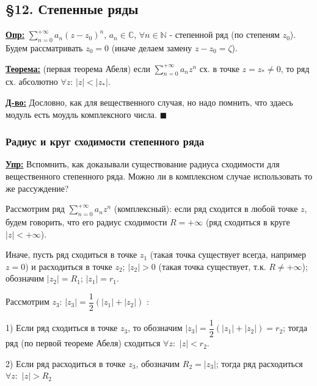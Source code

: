 \documentclass[a4paper, 12pt]{article}
\begin{document}
  \begin{center}
    \subsection*{\S12. Степенные ряды }
  \end{center}

	\quad \underline{\textbf{Опр:}} $\displaystyle \sum\limits_{n=0}^{+\infty} a_n (z-z_0)^n$, $a_n \in \mathbb{C}$, $\forall n \in \mathbb{N}$ - степенной ряд (по степеням $z_0$). Будем рассматривать $z_0 = 0$ (иначе делаем замену $z - z_0 = \zeta$). 
	
	\quad \underline{\textbf{Теорема:}} (первая теорема Абеля) если $\displaystyle\sum\limits_{n=0}^{+\infty}a_n z^n$ сх. в точке $z = z_{*} \neq 0 $, то ряд сх. абсолютно $\forall z$: $|z| < |z_{*}| $. 
	
	\quad \underline{\textbf{Д-во:}} Дословно, как для вещественного случая, но надо помнить, что здаесь модуль есть моудль комплексного числа. $\blacksquare$

  \subsubsection*{\centering Радиус и круг сходимости степенного ряда}

  \quad \underline{\textbf{Упр:}} Вспомнить, как доказывали существование радиуса сходимости для вещественного степенного ряда. Можно ли в комплексном случае использовать то же рассуждение?

  \quad Рассмотрим ряд $\displaystyle\sum\limits_{n=0}^{+\infty} a_n z^n $ (комплексный): если ряд сходится в любой точке $z$, будем говорить, что его радиус сходимости $R = +\infty$ (ряд сходиться в круге $|z| < +\infty$). 

  \quad Иначе, пусть ряд сходиться в точке $z_1$ (такая точка существует всегда, например $z=0$) и расходиться в точке $z_2$; $|z_2| > 0$ (такая точка существует, т.к. $R \neq +\infty$); обозначим $|z_2| = R_1$; $|z_1| = r_1$. 

  \quad Рассмотрим $z_3$: $|z_3| = \dfrac{1}{2}\left( |z_1| + |z_2| \right)$ :
  
  1) Если ряд сходиться в точке $z_3$, то обозначим $|z_3| = \dfrac{1}{2} \left(|z_1| + |z_2|\right) = r_2$; тогда ряд (по первой теореме Абеля) сходиться $\forall z:$ $|z| < r_2$.

  2) Если ряд расходиться в точке $z_3$, обозначим $R_2 = |z_3|$; тогда ряд расходиться $\forall z:$ $|z| > R_2$
\end{document}
